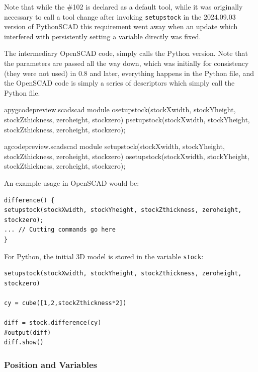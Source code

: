 \documentclass{ltxdoc}
\begin{document}
Note that while the \#102 is declared as a default tool, while it was originally necessary 
to call a tool change after invoking \verb|setupstock| in the 2024.09.03 version of
PythonSCAD this requirement went away when an update which interfered with persistently setting 
a variable directly was fixed.

The intermediary OpenSCAD code,  simply 
calls the Python version. Note that the parameters are passed all the way down, which was
initially for consistency (they were not used) in 0.8 and later, everything happens
in the Python file, and the OpenSCAD code is simply a series of descriptors which 
simply call the Python file.

\lstset{firstnumber=\thepyscad}
\begin{writecode}{a}{pygcodepreview.scad}{scad}
 module osetupstock(stockXwidth, stockYheight, stockZthickness, zeroheight, stockzero) {
     psetupstock(stockXwidth, stockYheight, stockZthickness, zeroheight, stockzero);
 }
 
\end{writecode}
\addtocounter{pyscad}{4}

\lstset{firstnumber=\thegcpscad}
\begin{writecode}{a}{gcodepreview.scad}{scad}
module setupstock(stockXwidth, stockYheight, stockZthickness, zeroheight, stockzero) {
  osetupstock(stockXwidth, stockYheight, stockZthickness, zeroheight, stockzero);
}

\end{writecode}
\addtocounter{gcpscad}{93}

An example usage in OpenSCAD would be:

\begin{verbatim}
difference() {
setupstock(stockXwidth, stockYheight, stockZthickness, zeroheight, stockzero);
... // Cutting commands go here
}
\end{verbatim}

For Python, the initial 3D model is stored in the variable \verb|stock|:

\begin{verbatim}
setupstock(stockXwidth, stockYheight, stockZthickness, zeroheight, stockzero)

cy = cube([1,2,stockZthickness*2])

diff = stock.difference(cy)
#output(diff)
diff.show()
\end{verbatim}

\subsubsection{Position and Variables}
 
\end{document}
